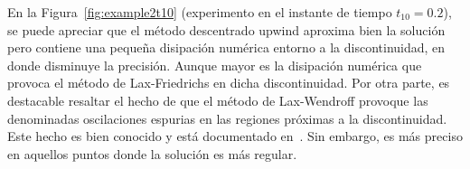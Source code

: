 En la Figura~\ref{fig:example2t10} (experimento en el instante de
tiempo $t_{10}=0.2$), se puede apreciar que el método descentrado
upwind aproxima bien la solución pero contiene una pequeña disipación
numérica entorno a la discontinuidad, en donde disminuye la
precisión.
Aunque mayor es la disipación numérica que provoca el método de
Lax-Friedrichs en dicha discontinuidad.
Por otra parte, es destacable resaltar el hecho de que el método de
Lax-Wendroff provoque las denominadas oscilaciones espurias en las
regiones próximas a la discontinuidad.
Este hecho es bien conocido y está documentado en~\cite{Leveque2002}.
Sin embargo, es más preciso en aquellos puntos donde la solución es
más regular.